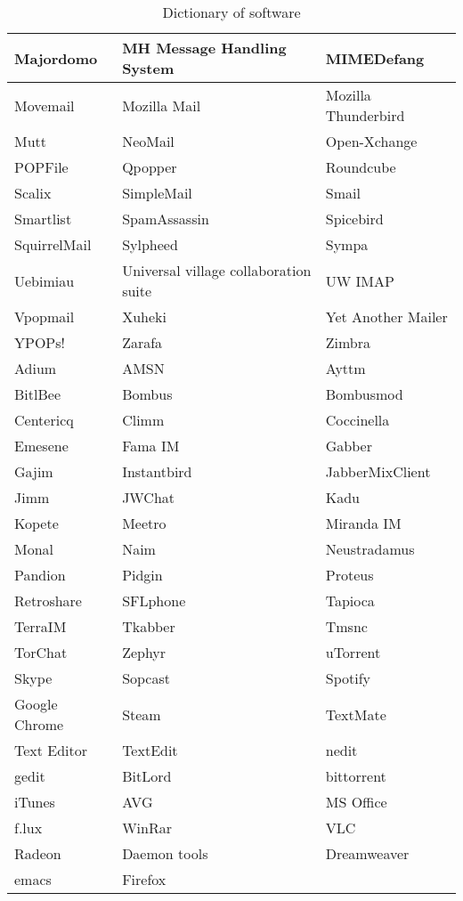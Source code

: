 \begin{table}
\begin{center}
\begin{tabular}{|l|l|l|}\hline
Majordomo&MH Message Handling System&MIMEDefang\\\hline
Movemail&Mozilla Mail&Mozilla Thunderbird\\\hline
Mutt&NeoMail&Open-Xchange\\\hline
POPFile&Qpopper&Roundcube\\\hline
Scalix&SimpleMail&Smail\\\hline
Smartlist&SpamAssassin&Spicebird\\\hline
SquirrelMail&Sylpheed&Sympa\\\hline
Uebimiau&Universal village collaboration suite&UW IMAP\\\hline
Vpopmail&Xuheki&Yet Another Mailer\\\hline
YPOPs!&Zarafa&Zimbra\\\hline
Adium&AMSN&Ayttm\\\hline
BitlBee&Bombus&Bombusmod\\\hline
Centericq&Climm&Coccinella\\\hline
Emesene&Fama IM&Gabber\\\hline
Gajim&Instantbird&JabberMixClient\\\hline
Jimm&JWChat&Kadu\\\hline
Kopete&Meetro&Miranda IM\\\hline
Monal&Naim&Neustradamus\\\hline
Pandion&Pidgin&Proteus\\\hline
Retroshare&SFLphone&Tapioca\\\hline
TerraIM&Tkabber&Tmsnc\\\hline
TorChat&Zephyr&uTorrent\\\hline
Skype&Sopcast&Spotify\\\hline
Google Chrome&Steam&TextMate\\\hline
Text Editor&TextEdit&nedit\\\hline
gedit&BitLord&bittorrent\\\hline
iTunes&AVG&MS Office\\\hline
f.lux&WinRar&VLC\\\hline
Radeon&Daemon tools&Dreamweaver\\\hline
emacs&Firefox&\\\hline
\end{tabular}
\end{center}
\caption{Dictionary of software}
\end{table}


